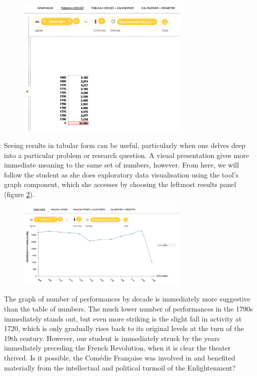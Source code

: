 \documentclass[	DIV=calc,%
							paper=a4,%
							fontsize=11pt,%
							twocolumn]{scrartcl}	 					%
\begin{document}
\begin{figure}
  \centering
	\includegraphics[width=3.25in]{steps/performances_by_decade.png}
	\caption{}
	\label{fig:performances_by_decade}
\end{figure}

Seeing results in tabular form can be useful, particularly when one delves deep into a particular problem or research question.  A visual presentation gives more immediate meaning to the same set of numbers, however.  From here, we will follow the student as she does exploratory data visualisation using the tool’s graph component, which she accesses by choosing the leftmost results panel (figure \ref{fig:performances_by_decade_graph}).

\begin{figure}
  \centering
	\includegraphics[width=3.25in]{steps/performances_by_decade_graph.png}
	\caption{}
	\label{fig:performances_by_decade_graph}
\end{figure}

The graph of number of performances by decade is immediately more suggestive than the table of numbers.  The much lower number of performances in the 1790s immediately stands out, but even more striking is the slight fall in activity at 1720, which is only gradually rises back to its original levels at the turn of the 19th century.  However, our student is immediately struck by the years immediately preceding the French Revolution, when it is clear the theater thrived.  Is it possible, the Comédie Française was involved in and benefited materially from the intellectual and political turmoil of the Enlightenment?
\end{document}
